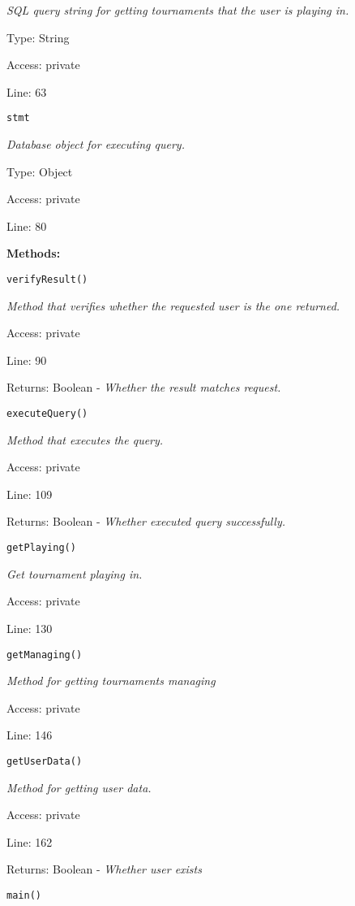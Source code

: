 {\scriptsize
\textit{SQL query string for getting tournaments that the user is playing in.}

Type: String

Access: private

Line: 63

}
\texttt{stmt}

{\scriptsize
\textit{Database object for executing query.}

Type: Object

Access: private

Line: 80

}
\textbf{Methods:}

\texttt{verifyResult()}

{\scriptsize
\textit{Method that verifies whether the requested user is the one returned.}

Access: private

Line: 90

Returns: Boolean - \textit{Whether the result matches request.}

}

\texttt{executeQuery()}

{\scriptsize
\textit{Method that executes the query.}

Access: private

Line: 109

Returns: Boolean - \textit{Whether executed query successfully.}

}

\texttt{getPlaying()}

{\scriptsize
\textit{Get tournament playing in.}

Access: private

Line: 130

}

\texttt{getManaging()}

{\scriptsize
\textit{Method for getting tournaments managing}

Access: private

Line: 146

}

\texttt{getUserData()}

{\scriptsize
\textit{Method for getting user data.}

Access: private

Line: 162

Returns: Boolean - \textit{Whether user exists}

}

\texttt{main()}

